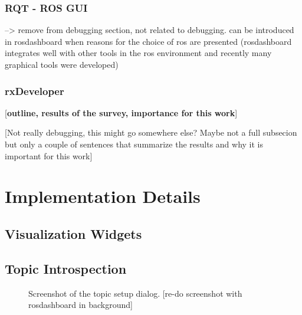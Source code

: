 \subsubsection{RQT - ROS GUI}
--> remove from debugging section, not related to debugging. can be introduced in rosdashboard when reasons for the choice of ros are presented (rosdashboard integrates well with other tools in the ros environment and recently many graphical tools were developed)

\subsubsection{rxDeveloper}
[\textbf{outline, results of the survey, importance for this work}]
\cite{Muellers2012}

[Not really debugging, this might go somewhere else? Maybe not a full subsecion but only a couple of sentences that summarize the results and why it is important for this work]

\section{Implementation Details}

\subsection{Visualization Widgets}

\subsection{Topic Introspection}

\begin{figure}[thpb]
  \centering
  \caption{Screenshot of the topic setup dialog. [re-do screenshot with rosdashboard in background]}
  \label{topic setup screenshot}
\end{figure}


